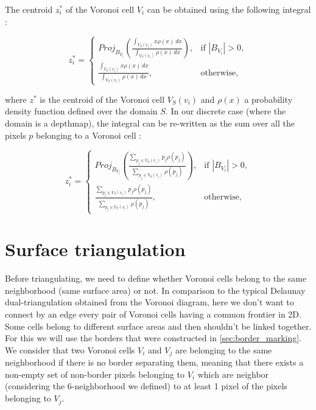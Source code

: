 \documentclass[11pt,fleqn]{book} %
\begin{document}
The centroid $z_i^*$ of the Voronoi cell $V_i$ can be obtained using the following integral :

\begin{equation}
		z_i^* = \begin{cases}
		Proj_{B_{V_i}}(\frac{\int_{V_S(v_i)} x\rho(x)\,dx}{\int_{V_S(v_i)} \rho(x)\,dx}) , & \text{if $|B_{V_i}| > 0$}, \\
		\frac{\int_{V_S(v_i)} x\rho(x)\,dx}{\int_{V_S(v_i)} \rho(x)\,dx}, & \text{otherwise}, 
		\end{cases}
\end{equation}

where $z^*$ is the centroid of the Voronoi cell $V_S(v_i)$ and $\rho(x)$ a probability density function defined over the domain $S$.
In our discrete case (where the domain is a depthmap), the integral can be re-written as the sum over all the pixels $p$ belonging to a Voronoi cell : 

\begin{equation}
		z_i^* = \begin{cases}
		Proj_{B_{V_i}}(\frac{\sum_{p_j \in V_S(v_i)} p_j\rho(p_j)}{\sum_{p_j \in V_S(v_i)} \rho(p_j)}) , & \text{if $|B_{V_i}| > 0$}, \\
		\frac{\sum_{p_j \in V_S(v_i)} p_j\rho(p_j)}{\sum_{p_j \in V_S(v_i)} \rho(p_j)}, & \text{otherwise}, 
		\end{cases}
\end{equation}

\section{Surface triangulation}
\label{sec:surface_triangulation}
Before triangulating, we need to define whether Voronoi cells belong to the same neighborhood (same surface area) or not. In comparison to the typical Delaunay dual-triangulation obtained from the Voronoi diagram, here we don't want to connect by an edge every pair of Voronoi cells having a common frontier in 2D. Some cells belong to different surface areas and then shouldn't be linked together.
For this we will use the borders that were constructed in \ref{sec:border_marking}.
We consider that two Voronoi cells $V_i$ and $V_j$ are belonging to the same neighborhood if there is no border separating them, meaning that there exists a non-empty set of non-border pixels belonging to $V_i$ which are neighbor (considering the 6-neighborhood we defined) to at least 1 pixel of the pixels belonging to $V_j$.
\end{document}
